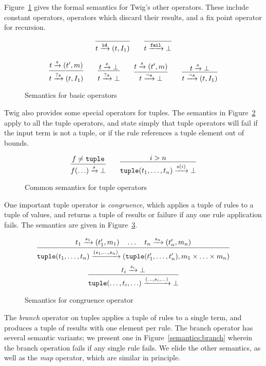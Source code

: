 Figure~\ref{semantics:basic} gives the formal semantics for Twig's other
operators. These include constant operators, operators which discard their
results, and a fix point operator for recursion.

\begin{figure}[ht]
\label{semantics:basic}
\[
\infer{t \arr{\mathtt{id}} (t,I_1)}{}
\qquad
\infer{t \arr{\mathtt{fail}} \bot}{}
\]

\[
\infer{t \arr{?s} (t,I_1)}{t \arr{s} (t',m)}
\qquad 
\infer{t \arr{?s} \bot}{t \arr{s} \bot}
\qquad
\infer{t \arr{\lnot s} \bot}{t \arr{s} (t',m)}
\qquad 
\infer{t \arr{\lnot s} (t,I_1)}{t \arr{s} \bot}
\]

\caption{Semantics for basic operators}
\end{figure}

Twig also provides some special operators for tuples. The semantics in
Figure~\ref{semantics:all-tuples} apply to all the tuple operators, and state
simply that tuple operators will fail if the input term is not a tuple, or if
the rule references a tuple element out of bounds.


\begin{figure}[ht]
\label{semantics:all-tuples}
\[
\infer{f(\ldots) \arr{s} \bot}
{f \neq \mathtt{tuple}}
\qquad
\infer{\mathtt{tuple}(t_1,\ldots,t_n) \arr{s(i)} \bot}{i > n}
\]
\caption{Common semantics for tuple operators}
\end{figure}


One important tuple operator is \emph{congruence}, which applies a tuple of
rules to a tuple of values, and returns a tuple of results or failure if any
one rule application fails. The semantics are given in
Figure~\ref{semantics:congruence}.


\begin{figure}[ht]
\label{semantics:congruence}
\[
\infer{
\mathtt{tuple}(t_1,\ldots,t_n)
\arr{(s_1,\ldots,s_n)}
(\mathtt{tuple}(t_1',\ldots,t_n'),m_1 \times \ldots \times m_n) }
{t_1 \arr{s_1} (t_1',m_1) \quad \ldots \quad t_n \arr{s_n} (t_n',m_n)}
\]
\[
\infer{
\mathtt{tuple}(\ldots,t_i,\ldots)
\arr{(\ldots,s_i,\ldots)}
\bot}
{t_i \arr{s_i} \bot}
\]
\caption{Semantics for congruence operator}
\end{figure}


The \emph{branch} operator on tuples applies a tuple of rules to a single
term, and produces a tuple of results with one element per rule. The branch
operator has several semantic variants; we present one in
Figure~\ref{semantics:branch} wherein the branch operation fails if any single
rule fails. We elide the other semantics, as well as the \emph{map} operator,
which are similar in principle.

